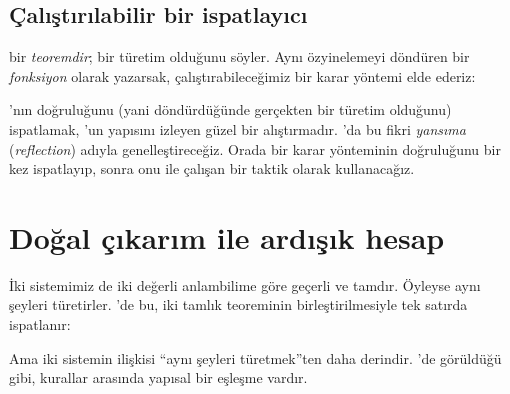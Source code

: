 \subsection{Çalıştırılabilir bir ispatlayıcı}

 bir \emph{teoremdir}; bir türetim olduğunu söyler. Aynı
özyinelemeyi  döndüren bir \emph{fonksiyon} olarak yazarsak,
çalıştırabileceğimiz bir karar yöntemi elde ederiz:


\noindent {}'nın doğruluğunu (yani   döndürdüğünde
gerçekten bir türetim olduğunu) ispatlamak, 'un yapısını
izleyen güzel bir alıştırmadır. 'da bu fikri \emph{yansıma}
(\emph{reflection}) adıyla genelleştireceğiz. Orada bir karar yönteminin
doğruluğunu bir kez ispatlayıp, sonra onu  ile çalışan bir
taktik olarak kullanacağız.

\section{Doğal çıkarım ile ardışık hesap}\label{sec:dogal-ardisik}

İki sistemimiz de iki değerli anlambilime göre geçerli ve tamdır. Öyleyse
aynı şeyleri türetirler. \Lean{}'de bu, iki tamlık teoreminin
birleştirilmesiyle tek satırda ispatlanır:


\noindent Ama iki sistemin ilişkisi ``aynı şeyleri türetmek''ten daha
derindir. 'de görüldüğü gibi, kurallar arasında
yapısal bir eşleşme vardır.

